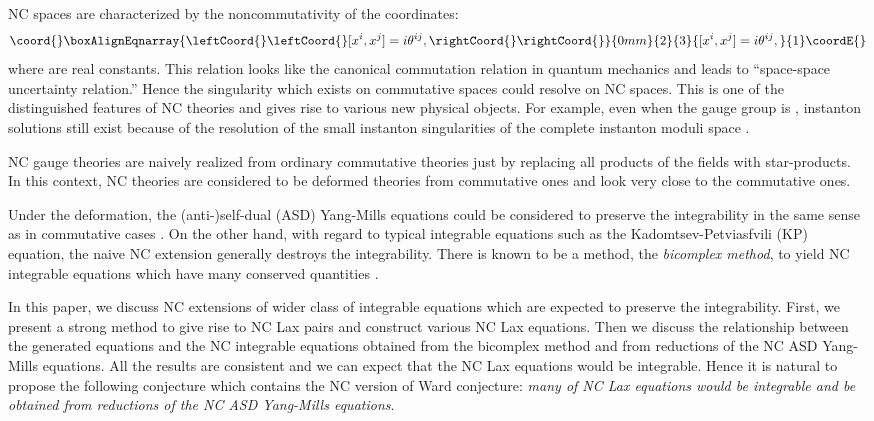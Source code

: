 \documentclass[a4paper,12pt]{article}\setlength{\topmargin}{-1cm}
\begin{document}
NC spaces are characterized by the noncommutativity of
the coordinates:
\begin{eqnarray}\coord{}\boxAlignEqnarray{\leftCoord{}
\label{nc_coord}
\leftCoord{}[x^i,x^j]=i\theta^{ij}, \rightCoord{}
\rightCoord{}}{0mm}{2}{3}{
[x^i,x^j]=i\theta^{ij}, 
}{1}\coordE{}\end{eqnarray}
where \coordHE{} are real constants.  
This relation looks like the canonical commutation
relation in quantum mechanics
and leads to ``space-space uncertainty relation.''
Hence
the singularity which exists on commutative spaces could resolve
on NC spaces.
This is one of the distinguished features of NC theories
and gives rise to various new physical objects.
For example, even when the gauge group is \coordHE{},
instanton solutions still exist \cite{NeSc}
because of the resolution of the small instanton singularities 
of the complete instanton moduli space \cite{Nakajima}.

NC gauge theories are naively realized from
ordinary commutative theories just by replacing
all products of the fields with star-products.
In this context, NC theories are
considered to be deformed theories from commutative ones
and look very close to the commutative ones.

Under the deformation,
the (anti-)self-dual (ASD) Yang-Mills equations
could be considered to preserve the integrability
in the same sense as in commutative cases \cite{KKO, Nekrasov}.
On the other hand, with regard to typical integrable equations
such as the Kadomtsev-Petviasfvili (KP) equation,
the naive NC extension generally destroys the integrability.
There is known to be a method, the {\it bicomplex method}, to yield
NC integrable equations which have many conserved quantities
\cite{Bicomplex, GrPe}.

In this paper, we discuss
NC extensions of wider class of integrable equations
which are expected to preserve the integrability.
First, we present a strong method 
to give rise to NC Lax pairs 
and construct various NC Lax equations.
Then we discuss the relationship between
the generated equations and the NC integrable equations 
obtained from the bicomplex method
and from reductions of the NC ASD Yang-Mills equations.
All the results are consistent and we can expect that 
the NC Lax equations would be integrable. 
Hence it is natural to
propose the following conjecture which contains 
the NC version of Ward conjecture:
{\it many of NC Lax equations would be integrable
and be obtained from reductions of the NC ASD Yang-Mills equations}.
\end{document}

